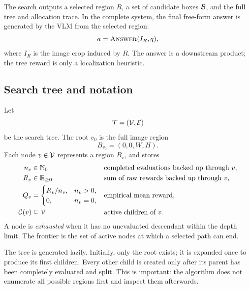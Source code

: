 The search outputs a selected region \(R\), a set of candidate boxes
\(\mathcal{B}\), and the full tree and allocation trace. In the complete system, the
final free-form answer is generated by the VLM from the selected region:
\begin{equation}
  a = \text{\textsc{Answer}}(I_R, q),
\end{equation}
where \(I_R\) is the image crop induced by \(R\). The answer is a downstream
product; the tree reward is only a localization heuristic.

\subsection{Search tree and notation}

Let
\begin{equation}
  \mathcal{T} = (\mathcal{V}, \mathcal{E})
\end{equation}
be the search tree. The root \(v_0\) is the full image region
\begin{equation}
  B_{v_0} = (0, 0, W, H).
\end{equation}
Each node \(v \in \mathcal{V}\) represents a region \(B_v\), and stores
\begin{align}
  n_v &\in \mathbb{N}_0
    && \text{completed evaluations backed up through } v, \\
  R_v &\in \mathbb{R}_{\ge 0}
    && \text{sum of raw rewards backed up through } v, \\
  Q_v &=
    \begin{cases}
      R_v / n_v, & n_v > 0, \\
      0, & n_v = 0,
    \end{cases}
    && \text{empirical mean reward}, \\
  \mathcal{C}(v) &\subseteq \mathcal{V}
    && \text{active children of } v.
\end{align}
A node is \emph{exhausted} when it has no unevaluated descendant within the
depth limit. The frontier is the set of active nodes at which a selected path
can end.

The tree is generated lazily. Initially, only the root exists; it is expanded
once to produce its first children. Every other child is created only after its
parent has been completely evaluated and split. This is important: the algorithm
does not enumerate all possible regions first and inspect them afterwards.


